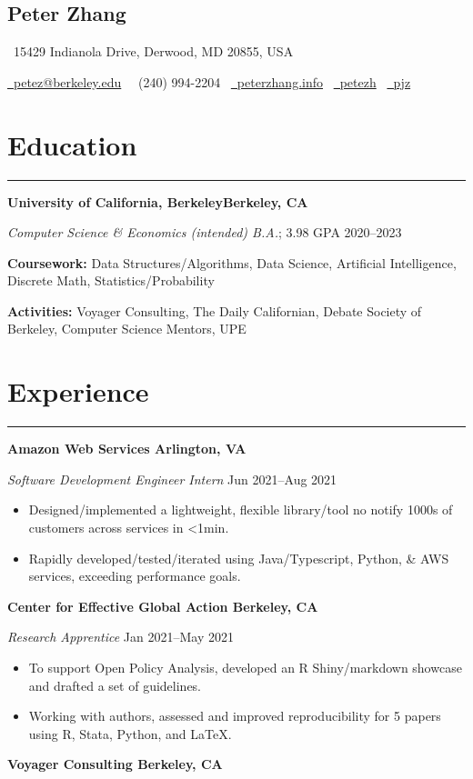 \documentclass[11pt]{article}
\newcommand{\name}[1]{\begin{center}\section*{\huge \color{highlight} #1}\vspace{-0.6cm}\end{center}}
\newcommand{\topinfo}[1]{\begin{center}\vspace{-0.2cm}#1\vspace{-0.2cm}\end{center}}
\newcommand{\resumesection}[1]{\vspace{-0.8cm}\section*{\color{highlight}#1}\vspace{-0.3cm}\hrule\vspace{0.2cm}}
\begin{document}
\name{Peter Zhang}
\topinfo{\faHome \ 15429 Indianola Drive, Derwood, MD 20855, USA}
\topinfo{\href{mailto:petez@berkeley.edu}{\faEnvelope \ petez@berkeley.edu} \ \faPhone \ (240) 994-2204 \ \href{https://peterzhang.info/}{\faBriefcase \ peterzhang.info} \  \href{https://github.com/petezh}{\faGithub \ petezh} \  \href{https://www.linkedin.com/in/pjz/}{\faLinkedinSquare \ pjz}}

\resumesection{Education}

\textbf{University of California, Berkeley\hfill Berkeley, CA} \par
\textit{Computer Science \& Economics (intended) B.A.}; 3.98 GPA \hfill 2020--2023\par
\textbf{Coursework:} Data Structures/Algorithms, Data Science, Artificial Intelligence, Discrete Math, Statistics/Probability\par
\textbf{Activities:} Voyager Consulting, The Daily Californian, Debate Society of Berkeley, Computer Science Mentors, UPE

\resumesection{Experience}


\textbf{Amazon Web Services \hfill Arlington, VA}\par

\textit{Software Development Engineer Intern} \hfill Jun 2021--Aug 2021
\begin{itemize}
	\item Designed/implemented a lightweight, flexible library/tool no notify 1000s of customers across services in <1min.
	\item Rapidly developed/tested/iterated using Java/Typescript, Python, \& AWS services, exceeding performance goals.
\end{itemize}\par

\textbf{Center for Effective Global Action \hfill Berkeley, CA}\par

\textit{Research Apprentice} \hfill Jan 2021--May 2021
\begin{itemize}
	\item To support Open Policy Analysis, developed an R Shiny/markdown showcase and drafted a set of guidelines.
	\item Working with authors, assessed and improved reproducibility for 5 papers using R, Stata, Python, and \LaTeX.
\end{itemize}\par

\textbf{Voyager Consulting \hfill Berkeley, CA}\par
\end{document}
